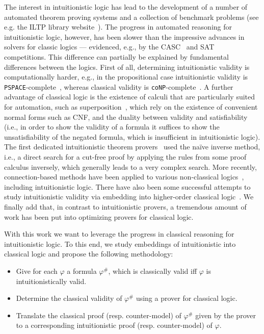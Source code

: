 \documentclass{easychair}
\theoremstyle{definition}
\theoremstyle{definition}
\theoremstyle{definition}
\theoremstyle{definition}
\theoremstyle{definition}
\theoremstyle{definition}
\theoremstyle{definition}
\begin{document}
The interest in intuitionistic logic has lead to the development of a number of automated theorem proving systems and a collection of benchmark problems (see e.g. the ILTP library website~\cite{iltp}).
The progress in automated reasoning for intuitionistic logic, however, has been slower than the  impressive advances in solvers for classic logics --- evidenced, e.g., by the CASC~\cite{casc} and SAT~\cite{satc} competitions.
This difference can partially be explained by fundamental differences between the logics.
First of all, determining intuitionistic validity is computationally harder, e.g., in the propositional case intuitionistic validity is \verb+PSPACE+-complete~\cite{statman1979intuitionistic}, whereas classical validity is \verb+coNP+-complete~\cite{cook1971complexity}.
A further advantage of classical logic is the existence of calculi that are particularly suited for automation, such as superposition~\cite{bachmair2001resolution}, which rely on the existence of convenient normal forms such as CNF, and the duality between validity and satisfiability (i.e., in order to show the validity of a formula it suffices to show the unsatisfiability of the negated formula, which is insufficient in intuitionistic logic).
The first dedicated intuitionistic theorem provers~\cite{mclaughlin2009efficient,tammet1996resolution} used the naïve inverse method, i.e., a direct search for a cut-free proof by applying the rules from some proof calculus inversely, which generally leads to a very complex search.
More recently, connection-based methods have been applied to various non-classical logics~\cite{otten2005clausal,otten2021nanocop}, including intuitionistic logic.
There have also been some successful attempts to study intuitionistic validity via embedding into higher-order classical logic~\cite{LEO}.
We finally add that, in contrast to intuitionistic provers, a tremendous amount of work has been put into optimizing provers for classical logic.

With this work we want to leverage the progress in classical reasoning for intuitionistic logic.
To this end, we study embeddings of intuitionistic into classical logic and propose the following methodology:
\begin{itemize}
	\item Give for each $\varphi$ a formula $\varphi^\#$, which is classically valid iff $\varphi$ is intuitionistically valid.
	\item Determine the classical validity of $\varphi^\#$ using a prover for classical logic.
	\item Translate the classical proof (resp. counter-model) of $\varphi^\#$ given by the prover to a corresponding intuitionistic proof (resp. counter-model) of $\varphi$.
\end{itemize}
\end{document}
